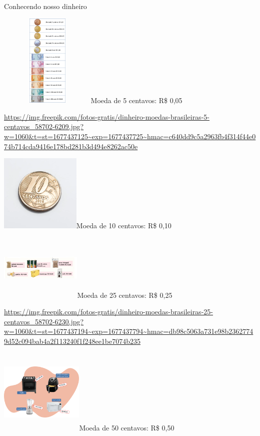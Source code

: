 Conhecendo nosso dinheiro

\includegraphics[width=1.80833in,height=1.75637in]{media/image64.png}Moeda
de 5 centavos: R\$ 0,05

\url{https://img.freepik.com/fotos-gratis/dinheiro-moedas-brasileiras-5-centavos_58702-6209.jpg?w=1060\&t=st=1677437125~exp=1677437725~hmac=c640dd9c5a2963fb4f314f44e074b714cda9416e178bd281b3d494e8262ac50e}

\includegraphics[width=1.50833in,height=1.45668in]{media/image65.png}Moeda
de 10 centavos: R\$ 0,10

\includegraphics[width=1.52500in,height=1.24749in]{media/image66.png}Moeda
de 25 centavos: R\$ 0,25

\url{https://img.freepik.com/fotos-gratis/dinheiro-moedas-brasileiras-25-centavos_58702-6230.jpg?w=1060\&t=st=1677437194~exp=1677437794~hmac=db98c5063a731e98b23627749d52c094bab4a2f113240f1f248ee1be7074b235}

\includegraphics[width=1.56667in,height=1.61849in]{media/image67.png}Moeda
de 50 centavos: R\$ 0,50

